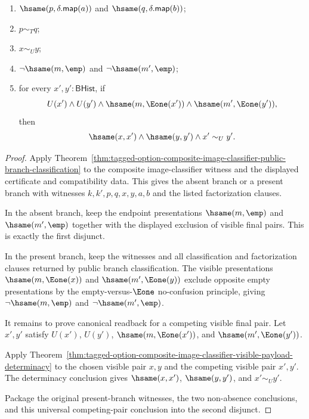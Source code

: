 \begin{theorem}
\begin{enumerate}
$T(\delta.\mathsf{map}(a))$, and $T(\delta.\mathsf{map}(b))$;
\item $\hsame(p,\delta.\mathsf{map}(a))$ and
$\hsame(q,\delta.\mathsf{map}(b))$;
\item $p\sim_T q$;
\item $x\sim_U y$;
\item $\neg\hsame(m,\emp)$ and $\neg\hsame(m',\emp)$;
\item for every $x',y':\mathsf{BHist}$, if
$$
U(x')\land U(y')\land
\hsame(m,\Eone(x'))\land
\hsame(m',\Eone(y')),
$$
then
$$
\hsame(x,x')\land \hsame(y,y')\land x'\sim_U y'.
$$
\end{enumerate}
\end{theorem}
\begin{proof}
Apply
Theorem~\ref{thm:tagged-option-composite-image-classifier-public-branch-classification}
to the composite image-classifier witness and the displayed certificate and
compatibility data. This gives the absent branch or a present branch with
witnesses $k,k',p,q,x,y,a,b$ and the listed factorization clauses.

In the absent branch, keep the endpoint presentations
$\hsame(m,\emp)$ and $\hsame(m',\emp)$ together with the displayed exclusion of
visible final pairs. This is exactly the first disjunct.

In the present branch, keep the witnesses and all classification and
factorization clauses returned by public branch classification. The visible
presentations $\hsame(m,\Eone(x))$ and $\hsame(m',\Eone(y))$ exclude opposite
empty presentations by the empty-versus-$\Eone$ no-confusion principle, giving
$\neg\hsame(m,\emp)$ and $\neg\hsame(m',\emp)$.

It remains to prove canonical readback for a competing visible final pair. Let
$x',y'$ satisfy $U(x')$, $U(y')$, $\hsame(m,\Eone(x'))$, and
$\hsame(m',\Eone(y'))$.

Apply
Theorem~\ref{thm:tagged-option-composite-image-classifier-visible-payload-determinacy}
to the chosen visible pair $x,y$ and the competing visible pair $x',y'$. The
determinacy conclusion gives $\hsame(x,x')$, $\hsame(y,y')$, and
$x'\sim_U y'$.

Package the original present-branch witnesses, the two non-absence conclusions,
and this universal competing-pair conclusion into the second disjunct.
\end{proof}

